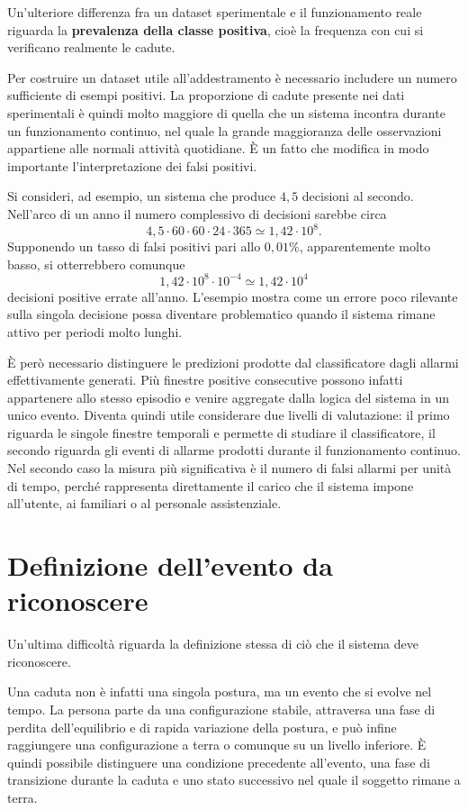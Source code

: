 Un'ulteriore differenza fra un dataset sperimentale e il funzionamento reale
riguarda la \textbf{prevalenza della classe positiva}, cioè la frequenza con
cui si verificano realmente le cadute.

Per costruire un dataset utile all'addestramento è necessario includere un
numero sufficiente di esempi positivi. La proporzione di cadute presente nei
dati sperimentali è quindi molto maggiore di quella che un sistema incontra
durante un funzionamento continuo, nel quale la grande maggioranza delle
osservazioni appartiene alle normali attività quotidiane. È un fatto che
modifica in modo importante l'interpretazione dei falsi positivi.

Si consideri, ad esempio, un sistema che produce $4{,}5$ decisioni al
secondo. Nell'arco di un anno il numero complessivo di decisioni sarebbe
circa
\[
4{,}5 \cdot 60 \cdot 60 \cdot 24 \cdot 365 \simeq 1{,}42 \cdot 10^{8}.
\]
Supponendo un tasso di falsi positivi pari allo $0{,}01\%$, apparentemente
molto basso, si otterrebbero comunque
\[
1{,}42 \cdot 10^{8} \cdot 10^{-4} \simeq 1{,}42 \cdot 10^{4}
\]
decisioni positive errate all'anno. L'esempio mostra come un errore poco
rilevante sulla singola decisione possa diventare problematico quando il
sistema rimane attivo per periodi molto lunghi.

È però necessario distinguere le predizioni prodotte dal classificatore dagli
allarmi effettivamente generati. Più finestre positive consecutive possono
infatti appartenere allo stesso episodio e venire aggregate dalla logica del
sistema in un unico evento. Diventa quindi utile considerare due livelli di
valutazione: il primo riguarda le singole finestre temporali e permette di
studiare il classificatore, il secondo riguarda gli eventi di allarme
prodotti durante il funzionamento continuo. Nel secondo caso la misura più
significativa è il numero di falsi allarmi per unità di tempo, perché
rappresenta direttamente il carico che il sistema impone all'utente, ai
familiari o al personale assistenziale.

\section{Definizione dell'evento da riconoscere}

Un'ultima difficoltà riguarda la definizione stessa di ciò che il sistema
deve riconoscere.

Una caduta non è infatti una singola postura, ma un evento che si evolve nel
tempo. La persona parte da una configurazione stabile, attraversa una fase di
perdita dell'equilibrio e di rapida variazione della postura, e può infine
raggiungere una configurazione a terra o comunque su un livello inferiore. È
quindi possibile distinguere una condizione precedente all'evento, una fase
di transizione durante la caduta e uno stato successivo nel quale il soggetto
rimane a terra.


